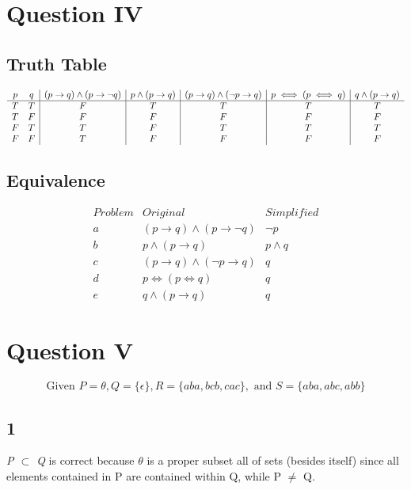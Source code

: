 \documentclass{article}
\begin{document}
\section*{Question IV}

\subsection*{Truth Table}
\begin{displaymath}
\begin{array}{c c|c|c|c|c|c} %
p & q & 
(p \rightarrow q) \land (p \rightarrow \neg q) & 
p \land (p \rightarrow q) & 
(p \rightarrow q) \land (\neg p \rightarrow q) &
p \iff (p \iff q) &
q \land (p \rightarrow q)
\\ 
\hline
T & T & F & T & T & T & T \\
T & F & F & F & F & F & F \\
F & T & T & F & T & T & T \\
F & F & T & F & F & F & F 
\end{array}
\end{displaymath}

\subsection*{Equivalence}
\begin{displaymath}
\begin{array}{c|c|c} %
Problem & Original & Simplified \\
\hline
a & (p \rightarrow q) \land (p \rightarrow \neg q) & \neg p \\ 
b & p \land (p \rightarrow q) & p \land q \\
c & (p \rightarrow q) \land (\neg p \rightarrow q) & q \\
d & p \iff (p \iff q) & q \\
e & q \land (p \rightarrow q) & q
\end{array}
\end{displaymath}

\section*{Question V}

\[ \textrm{Given } P = \theta, Q=\{\epsilon\}, R=\{aba, bcb, cac\}, \textrm{ and } S=\{aba, abc, abb\}\]

\subsection{1}
\textit{P $\subset$ Q} is correct because $\theta$ is a proper subset all of sets (besides itself) since all elements contained in P are contained within Q, while P $\neq$ Q.
\end{document}
